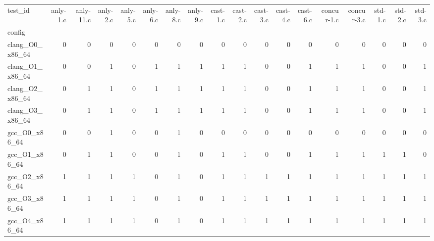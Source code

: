 \begin{tabular}{lrrrrrrrrrrrrrrrrr}
\toprule
test_id & anly-1.c & anly-11.c & anly-2.c & anly-5.c & anly-6.c & anly-8.c & anly-9.c & cast-1.c & cast-2.c & cast-3.c & cast-4.c & cast-6.c & concur-1.c & concur-3.c & std-1.c & std-2.c & std-3.c \\
config &  &  &  &  &  &  &  &  &  &  &  &  &  &  &  &  &  \\
\midrule
clang_O0_x86_64 & 0 & 0 & 0 & 0 & 0 & 0 & 0 & 0 & 0 & 0 & 0 & 0 & 0 & 0 & 0 & 0 & 0 \\
clang_O1_x86_64 & 0 & 0 & 1 & 0 & 1 & 1 & 1 & 1 & 1 & 0 & 0 & 1 & 1 & 1 & 0 & 0 & 1 \\
clang_O2_x86_64 & 0 & 1 & 1 & 0 & 1 & 1 & 1 & 1 & 1 & 0 & 0 & 1 & 1 & 1 & 0 & 0 & 1 \\
clang_O3_x86_64 & 0 & 1 & 1 & 0 & 1 & 1 & 1 & 1 & 1 & 0 & 0 & 1 & 1 & 1 & 0 & 0 & 1 \\
gcc_O0_x86_64 & 0 & 0 & 1 & 0 & 0 & 1 & 0 & 0 & 0 & 0 & 0 & 0 & 0 & 0 & 0 & 0 & 0 \\
gcc_O1_x86_64 & 0 & 1 & 1 & 0 & 0 & 1 & 0 & 1 & 1 & 0 & 0 & 1 & 1 & 1 & 1 & 1 & 0 \\
gcc_O2_x86_64 & 1 & 1 & 1 & 1 & 0 & 1 & 0 & 1 & 1 & 1 & 1 & 1 & 1 & 1 & 1 & 1 & 1 \\
gcc_O3_x86_64 & 1 & 1 & 1 & 1 & 0 & 1 & 0 & 1 & 1 & 1 & 1 & 1 & 1 & 1 & 1 & 1 & 1 \\
gcc_O4_x86_64 & 1 & 1 & 1 & 1 & 0 & 1 & 0 & 1 & 1 & 1 & 1 & 1 & 1 & 1 & 1 & 1 & 1 \\
\bottomrule
\end{tabular}
